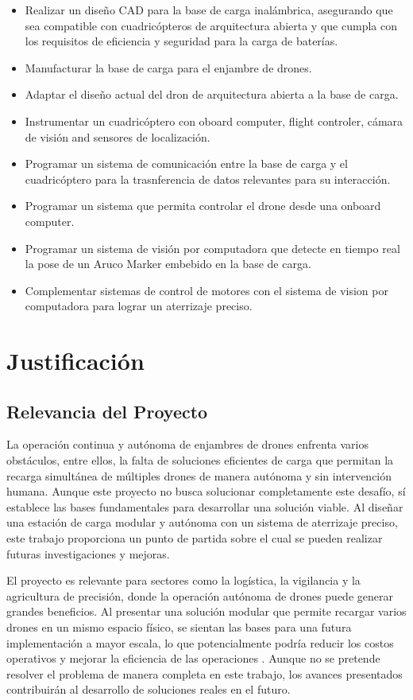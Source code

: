 \begin{itemize}
    \item Realizar un diseño CAD para la base de carga inalámbrica, asegurando que sea compatible con cuadricópteros de arquitectura abierta y que cumpla con los requisitos de eficiencia y seguridad para la carga de baterías.
    \item Manufacturar la base de carga para el enjambre de drones.
    \item Adaptar el diseño actual del dron de arquitectura abierta a la base de carga.
    \item Instrumentar un cuadricóptero con oboard computer, flight controler, cámara de visión and sensores de localización.
    \item Programar un sistema de comunicación entre la base de carga y el cuadricóptero para la trasnferencia de datos relevantes para su interacción.
    \item Programar un sistema que permita controlar el drone desde una onboard computer.
    \item Programar un sistema de visión por computadora que detecte en tiempo real la pose de un Aruco Marker embebido en la base de carga.
    \item Complementar sistemas de control de motores con el sistema de vision por computadora para lograr un aterrizaje preciso.
\end{itemize}

\section{Justificación}

\subsection{Relevancia del Proyecto}

La operación continua y autónoma de enjambres de drones enfrenta varios obstáculos, entre ellos, la falta de soluciones eficientes de carga que permitan la recarga simultánea de múltiples drones de manera autónoma y sin intervención humana. Aunque este proyecto no busca solucionar completamente este desafío, sí establece las bases fundamentales para desarrollar una solución viable. Al diseñar una estación de carga modular y autónoma con un sistema de aterrizaje preciso, este trabajo proporciona un punto de partida sobre el cual se pueden realizar futuras investigaciones y mejoras.

El proyecto es relevante para sectores como la logística, la vigilancia y la agricultura de precisión, donde la operación autónoma de drones puede generar grandes beneficios. Al presentar una solución modular que permite recargar varios drones en un mismo espacio físico, se sientan las bases para una futura implementación a mayor escala, lo que potencialmente podría reducir los costos operativos y mejorar la eficiencia de las operaciones \cite{cite1}. Aunque no se pretende resolver el problema de manera completa en este trabajo, los avances presentados contribuirán al desarrollo de soluciones reales en el futuro.

